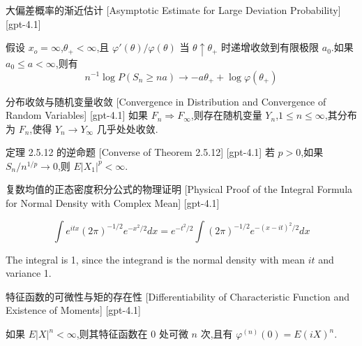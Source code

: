 \documentclass[UTF8]{ctexart}
\begin{document}
    \begin{thm}
        {大偏差概率的渐近估计}
        [Asymptotic Estimate for Large Deviation Probability]
        [gpt-4.1]
        
假设 $x_o = \infty$,$\theta_+ < \infty$,且 $\varphi'(\theta)/\varphi(\theta)$ 当 $\theta \uparrow \theta_+$ 时递增收敛到有限极限 $a_0$.如果 $a_0 \le a < \infty$,则有
\[
n^{-1} \log P(S_n \geq n a) \to -a \theta_+ + \log \varphi(\theta_+)
\]

    \end{thm}
    
    
    
    \begin{thm}
        {分布收敛与随机变量收敛}
        [Convergence in Distribution and Convergence of Random Variables]
        [gpt-4.1]
        如果 $F_n \Rightarrow F_\infty$,则存在随机变量 $Y_n$,$1 \leq n \leq \infty$,其分布为 $F_n$,使得 $Y_n \to Y_\infty$ 几乎处处收敛.
    \end{thm}
    
    
    
    \begin{thm}
        {定理 2.5.12 的逆命题}
        [Converse of Theorem 2.5.12]
        [gpt-4.1]
        若 $p > 0$,如果 $S_n / n^{1/p} \to 0$,则 $E|X_1|^p < \infty$.
    \end{thm}
    
    
    
    \begin{prf}
        {复数均值的正态密度积分公式的物理证明}
        [Physical Proof of the Integral Formula for Normal Density with Complex Mean]
        [gpt-4.1]
        
\[
\int e^{i t x} (2\pi)^{-1/2} e^{-x^{2}/2} dx = e^{-t^{2}/2} \int (2\pi)^{-1/2} e^{-(x - i t)^{2}/2} dx
\]

The integral is 1, since the integrand is the normal density with mean $i t$ and variance 1.

    \end{prf}
    
    
    
    \begin{thm}
        {特征函数的可微性与矩的存在性}
        [Differentiability of Characteristic Function and Existence of Moments]
        [gpt-4.1]
        
如果 $E|X|^n < \infty$,则其特征函数在 $0$ 处可微 $n$ 次,且有 $\varphi^{(n)}(0) = E (i X)^n$.

    \end{thm}
    
\end{document}
